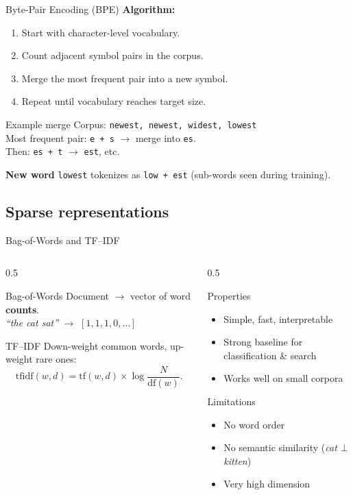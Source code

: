\documentclass[11pt,aspectratio=169]{beamer}
\begin{document}
\begin{frame}{Byte-Pair Encoding (BPE)}
\textbf{Algorithm:}
\begin{enumerate}
    \item Start with character-level vocabulary.
    \item Count adjacent symbol pairs in the corpus.
    \item Merge the most frequent pair into a new symbol.
    \item Repeat until vocabulary reaches target size.
\end{enumerate}
\vfill
\begin{exampleblock}{Example merge}
Corpus: \texttt{newest, newest, widest, lowest}\\
Most frequent pair: \texttt{e + s} $\to$ merge into \texttt{es}.\\
Then: \texttt{es + t} $\to$ \texttt{est}, etc.
\end{exampleblock}
\textbf{New word} \texttt{lowest} tokenizes as \texttt{low + est} (sub-words seen during training).
\end{frame}

\subsection{Sparse representations}

\begin{frame}{Bag-of-Words and TF--IDF}
\begin{columns}[T]
\begin{column}{0.5\textwidth}
\begin{block}{Bag-of-Words}
Document $\to$ vector of word \textbf{counts}.\\
\emph{``the cat sat''} $\to$ $[1, 1, 1, 0, \dots]$
\end{block}
\begin{block}{TF--IDF}
Down-weight common words, up-weight rare ones:
\[ \mathrm{tfidf}(w, d) = \mathrm{tf}(w, d) \times \log\frac{N}{\mathrm{df}(w)}. \]
\end{block}
\end{column}
\begin{column}{0.5\textwidth}
\begin{block}{Properties}
\begin{itemize}
    \item Simple, fast, interpretable
    \item Strong baseline for classification \& search
    \item Works well on small corpora
\end{itemize}
\end{block}
\begin{alertblock}{Limitations}
\begin{itemize}
    \item No word order
    \item No semantic similarity (\emph{cat $\bot$ kitten})
    \item Very high dimension
\end{itemize}
\end{alertblock}
\end{column}
\end{columns}
\end{frame}
\end{document}

